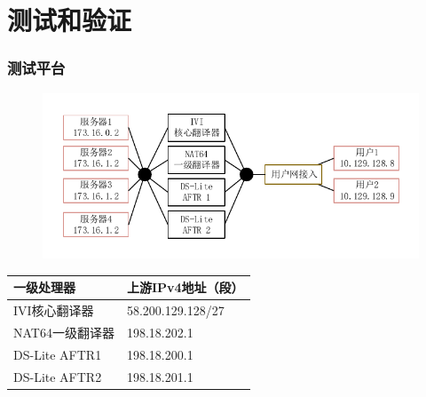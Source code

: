 \documentclass{beamer}
\begin{document}
\section{测试和验证}

\begin{frame}
  \frametitle{测试平台}
  \vspace{-1em}
  \begin{figure}
    \includegraphics[width=\textwidth]{figs/12-test-arch.pdf}
  \end{figure}
  \vspace{-2em}

  \begin{table}
    \begin{tabular}{l | l}
      一级处理器 & 上游IPv4地址（段）\\
      \hline
      IVI核心翻译器 & 58.200.129.128/27\\
      NAT64一级翻译器 & 198.18.202.1\\
      DS-Lite AFTR1 & 198.18.200.1\\
      DS-Lite AFTR2 & 198.18.201.1\\
    \end{tabular}
  \end{table}
\end{frame}
\end{document}
